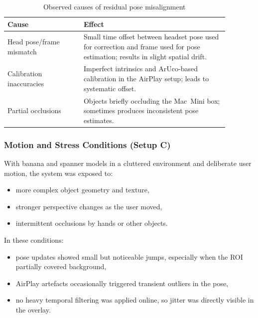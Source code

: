 \begin{table}[H]
    \centering
    \caption{Observed causes of residual pose misalignment}
    \label{tab:misalignment-causes-eval}
    \begin{tabular}{p{0.30\linewidth}p{0.58\linewidth}}
        \toprule
        \textbf{Cause} & \textbf{Effect} \\
        \midrule
        Head pose/frame mismatch &
        Small time offset between headset pose used for correction and frame used for pose estimation; results in slight spatial drift. \\
        Calibration inaccuracies &
        Imperfect intrinsics and ArUco-based calibration in the AirPlay setup; leads to systematic offset. \\
        Partial occlusions &
        Objects briefly occluding the Mac~Mini box; sometimes produces inconsistent pose estimates. \\
        \bottomrule
    \end{tabular}
\end{table}

\subsubsection{Motion and Stress Conditions (Setup C)}

With banana and spanner models in a cluttered environment and deliberate user motion, the system was exposed to:

\begin{itemize}
    \item more complex object geometry and texture,
    \item stronger perspective changes as the user moved,
    \item intermittent occlusions by hands or other objects.
\end{itemize}

In these conditions:

\begin{itemize}
    \item pose updates showed small but noticeable jumps, especially when the ROI partially covered background,
    \item AirPlay artefacts occasionally triggered transient outliers in the pose,
    \item no heavy temporal filtering was applied online, so jitter was directly visible in the overlay.
\end{itemize}

